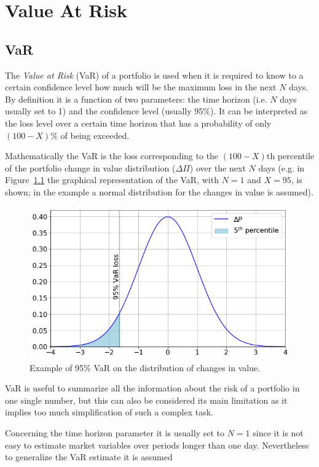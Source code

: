 \chapter{Value At Risk}
\label{var-and-credit-risk}

\section{VaR}
\label{value-at-risk}

The \emph{Value at Risk} (VaR) of a portfolio is used when it is required to know to a certain confidence level how much will be the maximum loss in the next $N$ days. By definition it is a function of two parameters: the time horizon (i.e. $N$ days usually set to 1) and the confidence level (usually 95\%). 
It can be interpreted as the loss level over a certain time horizon that has a probability of only \((100 - X)\%\) of being exceeded. 

Mathematically the VaR is the loss corresponding to the \((100-X)\textrm{th}\) percentile of the portfolio change in value distribution ($\Delta\Pi$) over the next $N$ days (e.g. in Figure~\ref{fig:var_loss} the graphical representation of the VaR, with $N=1$ and $X=95$, is shown; in the example a normal distribution for the changes in value is assumed).

\begin{figure}[htb]
\centering
\includegraphics[width=0.6\linewidth]{figures/95_var.png}
\caption{Example of 95\% VaR on the distribution of changes in value.}
\label{fig:var_loss}
\end{figure}
    
VaR is useful to summarize all the information about the risk of a portfolio in one single number, but this can also be considered its main limitation as it implies too much simplification of such a complex task.

Concerning the time horizon parameter it is usually set to $N=1$ since it is not easy to estimate market variables over periods longer than one day. Nevertheless to generalize the VaR estimate it is assumed

